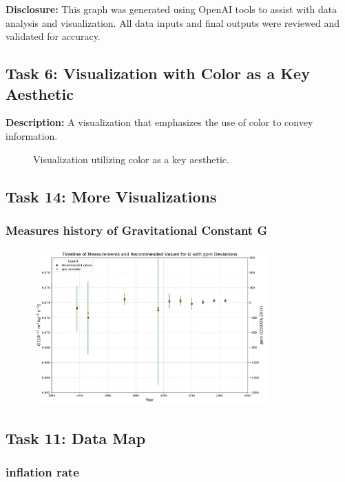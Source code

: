 \documentclass[a4paper,landscape]{article}
\begin{document}
\textbf{Disclosure:} This graph was generated using OpenAI tools to assist with data analysis and visualization. All data inputs and final outputs were reviewed and validated for accuracy.

\subsection{Task 6: Visualization with Color as a Key Aesthetic}
\textbf{Description:} A visualization that emphasizes the use of color to convey information.

\begin{figure}[H]
    \centering
    \caption{Visualization utilizing color as a key aesthetic.}
    \label{fig:color}
\end{figure}

\subsection{Task 14: More Visualizations}
\subsubsection{Measures history of Gravitational Constant G}

\begin{figure}[H]
    \centering
    \includegraphics[width=0.8\textwidth]{gravitational_constant.pdf} %
    \caption{}
    \label{fig:G}
\end{figure}

\subsection{Task 11: Data Map}
\subsubsection{inflation rate}
\end{document}
